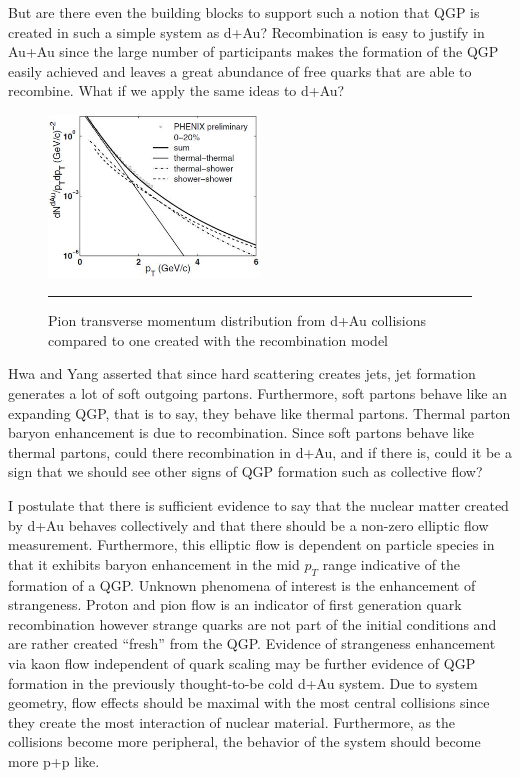 But are there even the building blocks to support such a notion that QGP is created in such a simple system as d+Au? Recombination is easy to justify in Au+Au since the large number of participants makes the formation of the QGP easily achieved and leaves a great abundance of free quarks that are able to recombine. What if we apply the same ideas to d+Au? 
\begin{figure}[b!]
  \centering
    \includegraphics[width=0.5\textwidth]{prevplots/daurecomb.JPG}
    \rule{35em}{0.5pt}
  \caption[Pion transverse momentum distribution from d+Au collisions compared to one created with the recombination model]{Pion transverse momentum distribution from d+Au collisions compared to one created with the recombination model}
  \label{fig:daaaratios}
\end{figure}
Hwa and Yang asserted \citep{PhysRevLett.93.082302} that since hard scattering creates jets, jet formation generates a lot of soft outgoing partons. Furthermore, soft partons behave like an expanding QGP, that is to say, they behave like thermal partons. Thermal parton baryon enhancement is due to recombination. Since soft partons behave like thermal partons, could there recombination in d+Au, and if there is, could it be a sign that we should see other signs of QGP formation such as collective flow? 

I postulate that there is sufficient evidence to say that the nuclear matter created by d+Au behaves collectively and that there should be a non-zero elliptic flow measurement. Furthermore, this elliptic flow is dependent on particle species in that it exhibits baryon enhancement in the mid $p_T$ range indicative of the formation of a QGP. Unknown phenomena of interest is the enhancement of strangeness. Proton and pion flow is an indicator of first generation quark recombination however strange quarks are not part of the initial conditions and are rather created ``fresh'' from the QGP.  Evidence of strangeness enhancement via kaon flow independent of quark scaling may be further evidence of QGP formation in the previously thought-to-be cold d+Au system. Due to system geometry, flow effects should be maximal with the most central collisions since they create the most interaction of nuclear material. Furthermore, as the collisions become more peripheral, the behavior of the system should become more p+p like.
\pagebreak
\pagebreak
